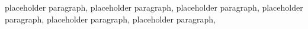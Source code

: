 \quad  placeholder paragraph, placeholder paragraph, placeholder paragraph, placeholder paragraph, placeholder paragraph, placeholder paragraph,
